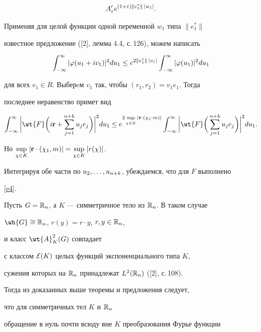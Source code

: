 \begin{pf}
\begin{multline*}
A'_\ve e^{(1+\ve)\|e_1^*\|\,|w_1|}.


\end{multline*}


Применяя для целой функции одной переменной $w_1$ типа $\|e_1^*\|$ 


известное предложение ([2], лемма 4.4, с.\,126), можем написать


$$


\int_{-\iy}^{\iy}|\vp(u_1+iv_1)|^2du_1\le e^{2\|e_1^*\|\,|v_1|}


\int_{-\iy}^\iy|\vp(u_1)|^2du_1


$$


для всех $v_1\in R$. Выберeм $v_1$ так, чтобы $(r_1,r_2)=v_1e_1$. Тогда 


последнее неравенство примет вид


$$


\int_{-\iy}^\iy\bigg|\wt{F}\bigg(i\bold r+\sum_{j=1}^{n+k} u_je_j\bigg)


\bigg|^2du_1\le


e^{2\sup\li_{\chi\in K}|\bold r\cd(\chi_1\cd m)|}


\int_{-\iy}^\iy\bigg|\wt{F}\bigg(\sum_{j=1}^{n+k} u_je_j\bigg)\bigg|^2du_1.


$$


Но $\sup\limits_{\chi\in K}|\bold r\cdot(\chi_1,m)|=\sup\limits_{\chi\in K}|r(\chi)|$. 


Интегрируя обе части по $u_2,\dotsc,u_{n+k}$, убеждаемся, что для $F$ выполнено


\eqref{e4}.


\end{pf}





Пусть $G=\Bbb R_n$, а $K$ --- симметричное тело из $\Bbb R_n$. В таком случае 


$\wh{G}\cong \Bbb R_n$, $r(y)=r\cdot y$, $r,y\in \Bbb R_n$,


и класс $\wt{A}_K^2(G)$ совпадает 


с классом ${\cal E}(K)$ целых функций экспоненциального типа $K$,


сужения которых на $\Bbb R_n$ принадлежат $L^2(\Bbb R_n)$ ([2], с.\,108).


Тогда из доказанных выше теоремы и предложения следует, 


что для симметричных тел $K$ и $\Bbb R_n$ 


обращение в нуль почти всюду вне $K$ преобразования Фурье функции 


